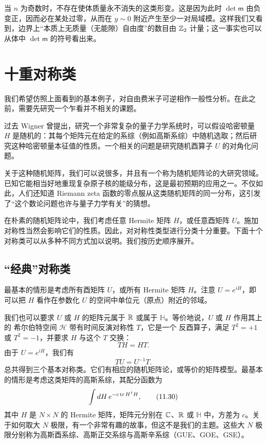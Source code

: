 当 $n$ 为奇数时，不存在使体质量永不消失的这类形变。这是因为此时 $\det\mathsf{m}$ 由负变正，因而必在某处过零，从而在 $y\sim0$ 附近产生至少一对局域模。这样我们又看到，边界上“本质上无质量（无能隙）自由度”的数目由 $\mathbb{Z}_2$ 计量；这一事实也可以从体中 $\det\mathsf{m}$ 的符号看出来。


\section{十重对称类}

我们希望仿照上面看到的基本例子，对自由费米子可逆相作一般性分析。在此之前，需要先研究一个乍看并不相关的课题。

过去 Wigner 曾提出，研究一个非常复杂的量子力学系统时，可以假设哈密顿量 $H$ 是随机的：其每个矩阵元在给定的系综（例如高斯系综）中随机选取；然后研究这种哈密顿量本征值的性质。一个相关的问题是研究随机酉算子 $U$ 的对角化问题。

关于这种随机矩阵，我们可以说很多，并且有一个称为随机矩阵论的大研究领域。已知它能相当好地重现复杂原子核的能级分布，这是最初预期的应用之一。不仅如此，人们还知道 Riemann zeta 函数的零点服从这类随机矩阵的同一分布，这引发了“这个数论问题也许与量子力学有关”的猜想。

在朴素的随机矩阵论中，我们考虑任意 Hermite 矩阵 $H$，或任意酉矩阵 $U$。施加对称性当然会影响它们的性质。因此，对对称性类型进行分类十分重要。下面十个对称类可以从多种不同方式加以说明。我们按历史顺序展开。

\subsection{“经典”对称类}

最基本的情形是考虑所有酉矩阵 $U$，或所有 Hermite 矩阵 $H$。注意 $U=e^{iH}$，即可以把 $H$ 看作在参数化 $U$ 的空间中单位元（原点）附近的邻域。

我们也可以要求 $U$ 或 $H$ 的矩阵元属于 $\mathbb{R}$ 或属于 $\mathbb{H}$。等价地说，$U$ 或 $H$ 作用其上的 希尔伯特空间 $\mathcal{H}$ 带有时间反演对称性 $T$，它是一个
反酉算子，满足 $T^2=+1$ 或 $T^2=-1$，并要求 $H$ 与这个 $T$ 交换：
\begin{equation}
TH=HT. \tag{11.28}
\end{equation}
由于 $U=e^{iH}$，我们有
\begin{equation}
TU=U^{-1}T. \tag{11.29}
\end{equation}
总共得到三个基本对称类。它们有相应的随机矩阵论，或等价的矩阵模型。最基本的情形是考虑这类矩阵的高斯系综，其配分函数为
\begin{equation}
\int dH\,e^{-c\operatorname{tr} H^\dagger H}, \tag{11.30}
\end{equation}
其中 $H$ 是 $N\times N$ 的 Hermite 矩阵，矩阵元分别在 $\mathbb{C}$、$\mathbb{R}$ 或 $\mathbb{H}$ 中，方差为 $c$。关于如何取大 $N$ 极限，有一个非常有趣的故事，但这不是我们的主题。这些大 $N$ 极限分别称为高斯酉系综、高斯正交系综与高斯辛系综（GUE、GOE、GSE）。

